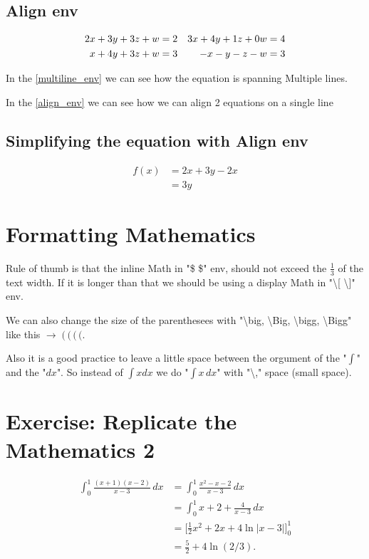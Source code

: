 \documentclass[12pt,titlepage]{article}
\begin{document}
\subsection{Align env}
\begin{align} \label{align_env}
    2x+3y+3z+w&=2 & 3x+4y+1z+0w&=4 \\
    x+4y+3z+w&=3 & -x-y-z-w&=3 \notag %
\end{align}

In the \eqref{multiline_env} we can see how the equation is spanning Multiple lines.

In the \eqref{align_env} we can see how we can align 2 equations on a single line

\subsection{Simplifying the equation with Align env}
\begin{align*}
    f(x)&=2x+3y-2x\\
    &= 3y
\end{align*}

\section{Formatting Mathematics}
Rule of thumb is that the inline Math in "\$ \$" env, should not exceed the $\frac{1}{3}$ of the text width. If it is longer than that we should be using a display Math in "\textbackslash[ \textbackslash]" env.
\vspace{0.5cm}

We can also change the size of the parenthesees with "\textbackslash big, \textbackslash Big, \textbackslash bigg, \textbackslash Bigg" like this $\longrightarrow \; \Bigg( \, \bigg( \, \Big( \, \big($.

Also it is a good practice to leave a little space between the orgument of the "$\int$" and the "$dx$". So instead of $\int xdx$ we do "$\int x\,dx$" with "\textbackslash ," space (small space).

\section{Exercise: Replicate the Mathematics 2}
\begin{align*}
    \int_{0}^{1} \frac{(x+1)(x-2)}{x-3}\,dx &= \int_{0}^{1}\frac{x^2-x-2}{x-3}\,dx\\
    &= \int_{0}^{1} x+2+\frac{4}{x-3}\,dx\\
    &= \bigg[\frac{1}{2}x^2+2x+4\ln \vert x-3\vert\bigg]_{0}^{1}\\
    &= \frac{5}{2}+4 \ln (2/3).
\end{align*}
\end{document}
